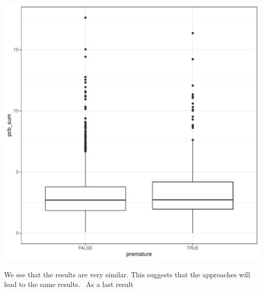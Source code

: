 \documentclass{article}\usepackage[]{graphicx}\usepackage[]{color}
\makeatletter
\def\maxwidth{ %
  \ifdim\Gin@nat@width>\linewidth
    \linewidth
  \else
    \Gin@nat@width
  \fi
}
\newenvironment{kframe}{%
 \def\at@end@of@kframe{}%
 \ifinner\ifhmode%
  \def\at@end@of@kframe{\end{minipage}}%
  \begin{minipage}{\columnwidth}%
 \fi\fi%
 \def\FrameCommand##1{\hskip\@totalleftmargin \hskip-\fboxsep
 \colorbox{shadecolor}{##1}\hskip-\fboxsep
     \hskip-\linewidth \hskip-\@totalleftmargin \hskip\columnwidth}%
 \MakeFramed {\advance\hsize-\width
   \@totalleftmargin\z@ \linewidth\hsize
   \@setminipage}}%
 {\par\unskip\endMakeFramed%
 \at@end@of@kframe}
\newenvironment{knitrout}{}{} %
\makeatother
\begin{document}
\begin{knitrout}
\begin{kframe}
{\ttfamily\noindent\color{warningcolor}{\#\# Warning: Removed 1 rows containing non-finite values (stat\_boxplot).}}\end{kframe}
\includegraphics[width=\maxwidth]{figure/unnamed-chunk-11-2} 

\end{knitrout}
We see that the results are very similar. This suggests that the approaches will lead to the same results. \
As a last result 
\end{document}
